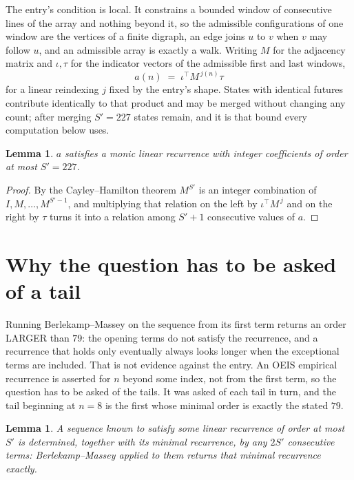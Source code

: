 \documentclass[11pt,a4paper]{article}
\theoremstyle{plain}
\newtheorem{lemma}[theorem]{Lemma}
\theoremstyle{definition}
\begin{document}
The entry's condition is local. It constrains a bounded window of consecutive lines of the
array and nothing beyond it, so the admissible configurations of one window are the vertices of
a finite digraph, an edge joins $u$ to $v$ when $v$ may follow $u$, and an admissible array is
exactly a walk. Writing $M$ for the adjacency matrix and $\iota,\tau$ for the indicator vectors
of the admissible first and last windows,
\[
a(n)\;=\;\iota^{\!\top}M^{\,j(n)}\tau
\]
for a linear reindexing $j$ fixed by the entry's shape. States with identical futures
contribute identically to that product and may be merged without changing any count; after
merging $S'=227$ states remain, and it is that bound every computation below uses.

\begin{lemma}\label{lem:cf}
$a$ satisfies a monic linear recurrence with integer coefficients of order at most $S'=227$.
\end{lemma}

\begin{proof}
By the Cayley--Hamilton theorem $M^{S'}$ is an integer combination of $I,M,\dots,M^{S'-1}$,
and multiplying that relation on the left by $\iota^{\!\top}M^{\,j}$ and on the right by
$\tau$ turns it into a relation among $S'+1$ consecutive values of $a$.
\end{proof}

\section{Why the question has to be asked of a tail}

Running Berlekamp--Massey on the sequence from its first term returns an order LARGER than $79$: the opening terms do not satisfy the recurrence, and a recurrence that holds only eventually always looks longer when the exceptional terms are included. That is not evidence against the entry. An OEIS empirical recurrence is asserted for $n$ beyond some index, not from the first term, so the question has to be asked of the tails. It was asked of each tail in turn, and the tail beginning at $n=8$ is the first whose minimal order is exactly the stated $79$.

\begin{lemma}\label{lem:bm}
A sequence known to satisfy some linear recurrence of order at most $S'$ is determined,
together with its minimal recurrence, by any $2S'$ consecutive terms: Berlekamp--Massey applied
to them returns that minimal recurrence exactly.
\end{lemma}
\end{document}
